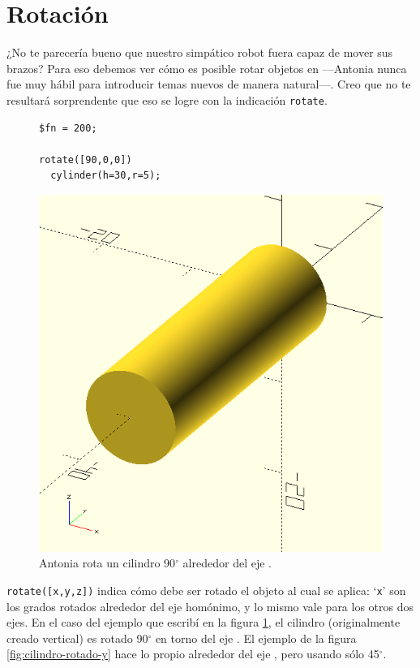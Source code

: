   \section{Rotación}

  \guillemotright ¿No te parecería bueno que nuestro simpático robot
  fuera capaz de mover sus brazos? Para eso debemos ver cómo es
  posible rotar objetos en \openscad ---Antonia nunca fue muy hábil
  para introducir temas nuevos de manera natural---. Creo que no te
  resultará sorprendente que eso se logre con la indicación
  \lstinline!rotate!.

  \begin{figure}[ht]
  \begin{minipage}[]{.5\textwidth}
    \begin{lstlisting}
$fn = 200;

rotate([90,0,0])
  cylinder(h=30,r=5);
    \end{lstlisting}%
  \end{minipage}\hfill
    \begin{minipage}[]{.5\textwidth}
      \centering
      \includegraphics[width=.6\textwidth]{imagenes/cilindro-rotado-x}
    \end{minipage}
    \caption{Antonia rota un cilindro 90$^{\circ}$ alrededor del eje
      .}
  \label{fig:cilindro-rotado-x}
\end{figure}


\guillemotright \lstinline!rotate([x,y,z])! indica cómo debe ser
rotado el objeto al cual se aplica: `\texttt{x}' son los grados
rotados alrededor del eje homónimo, y lo mismo vale para los otros dos
ejes. En el caso del ejemplo que escribí en la figura
\ref{fig:cilindro-rotado-x}, el cilindro (originalmente creado
vertical) es rotado
90$^{\circ}$ en torno del eje . El ejemplo de la figura
\ref{fig:cilindro-rotado-y} hace lo propio alrededor del eje
, pero usando sólo 45$^{\circ}$.

